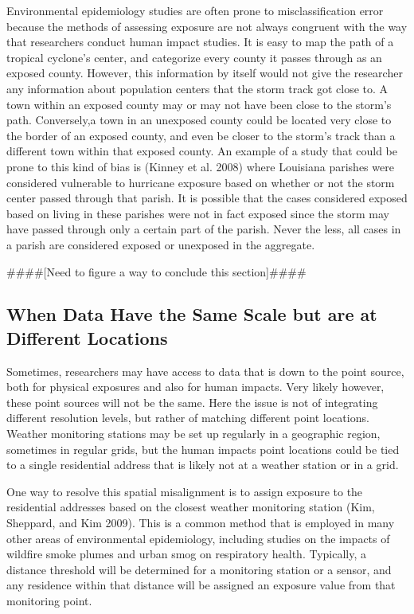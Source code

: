 \documentclass[
]{article}
\begin{document}
Environmental epidemiology studies are often prone to misclassification
error because the methods of assessing exposure are not always congruent
with the way that researchers conduct human impact studies. It is easy
to map the path of a tropical cyclone's center, and categorize every
county it passes through as an exposed county. However, this information
by itself would not give the researcher any information about population
centers that the storm track got close to. A town within an exposed
county may or may not have been close to the storm's path. Conversely,a
town in an unexposed county could be located very close to the border of
an exposed county, and even be closer to the storm's track than a
different town within that exposed county. An example of a study that
could be prone to this kind of bias is (Kinney et al. 2008) where
Louisiana parishes were considered vulnerable to hurricane exposure
based on whether or not the storm center passed through that parish. It
is possible that the cases considered exposed based on living in these
parishes were not in fact exposed since the storm may have passed
through only a certain part of the parish. Never the less, all cases in
a parish are considered exposed or unexposed in the aggregate.

\#\#\#\#{[}Need to figure a way to conclude this section{]}\#\#\#\#

\hypertarget{when-data-have-the-same-scale-but-are-at-different-locations}{%
\subsection{When Data Have the Same Scale but are at Different
Locations}\label{when-data-have-the-same-scale-but-are-at-different-locations}}

Sometimes, researchers may have access to data that is down to the point
source, both for physical exposures and also for human impacts. Very
likely however, these point sources will not be the same. Here the issue
is not of integrating different resolution levels, but rather of
matching different point locations. Weather monitoring stations may be
set up regularly in a geographic region, sometimes in regular grids, but
the human impacts point locations could be tied to a single residential
address that is likely not at a weather station or in a grid.

One way to resolve this spatial misalignment is to assign exposure to
the residential addresses based on the closest weather monitoring
station (Kim, Sheppard, and Kim 2009). This is a common method that is
employed in many other areas of environmental epidemiology, including
studies on the impacts of wildfire smoke plumes and urban smog on
respiratory health. Typically, a distance threshold will be determined
for a monitoring station or a sensor, and any residence within that
distance will be assigned an exposure value from that monitoring point.
\end{document}
